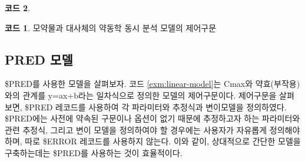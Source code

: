 \documentclass[
  10pt,
  krantz2,
  a4paper]{krantz}
\newenvironment{Shaded}{\begin{snugshade}}{\end{snugshade}}
\newcommand{\DecValTok}[1]{\textcolor[rgb]{0.00,0.00,0.81}{#1}}
\newcommand{\FloatTok}[1]{\textcolor[rgb]{0.00,0.00,0.81}{#1}}
\newcommand{\KeywordTok}[1]{\textcolor[rgb]{0.13,0.29,0.53}{\textbf{#1}}}
\newcommand{\NormalTok}[1]{#1}
\newcommand{\OperatorTok}[1]{\textcolor[rgb]{0.81,0.36,0.00}{\textbf{#1}}}
\newcommand{\StringTok}[1]{\textcolor[rgb]{0.31,0.60,0.02}{#1}}
\theoremstyle{definition}
\theoremstyle{definition}
\newtheorem{example}{코드}[chapter]
\theoremstyle{definition}
\theoremstyle{remark}
\begin{document}
\begin{example}
\begin{example}

\protect\hypertarget{exm:parent-metabolite}{}{\label{exm:parent-metabolite} }모약물과 대사체의 약동학 동시 분석 모델의 제어구문

\end{example}
\end{example}

\hypertarget{pred-uxbaa8uxb378}{%
\subsection{PRED 모델}\label{pred-uxbaa8uxb378}}

\$PRED를 사용한 모델을 살펴보자. 코드 \ref{exm:linear-model}는 Cmax와 약효(부작용)와의 관계를 y=ax+b라는 일차식으로 정의한 모델의 제어구문이다. 제어구문을 살펴보면, \$PRED 레코드를 사용하여 각 파라미터와 추정식과 변이모델을 정의하였다. \$PRED에는 사전에 약속된 구문이나 옵션이 없기 때문에 추정하고자 하는 파라미터와 관련 추정식, 그리고 변이 모델을 정의하여야 할 경우에는 사용자가 자유롭게 정의해야 하며, 따로 \$ERROR 레코드를 사용하지 않는다. 이와 같이, 상대적으로 간단한 모델을 구축하는데는 \$PRED를 사용하는 것이 효율적이다.

\begin{Shaded}
\end{Shaded}
\end{document}
